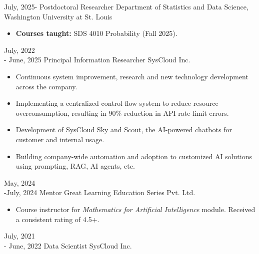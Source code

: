 \documentclass[10pt]{developercv} %
\begin{document}
\vspace{-12pt}
\begin{entrylist}
    \entry
    {July, 2025-}
    {Postdoctoral Researcher}
    {Department of Statistics and Data Science, Washington University at St. Louis}
    {\vspace{-7pt}\small
    \begin{itemize}[noitemsep,topsep=0pt,parsep=0pt,partopsep=0pt, leftmargin=10pt]
        \item \textbf{Courses taught:} SDS 4010 Probability (Fall 2025).
    \end{itemize}
    }
    \entry
    {July, 2022\\ - June, 2025}
    {Principal Information Researcher}
    {SysCloud Inc.}
    {\vspace{-7pt}\small
        \begin{itemize}[noitemsep,topsep=0pt,parsep=0pt,partopsep=0pt, leftmargin=10pt]
            \item Continuous system improvement, research and new technology development across the company.
            \item Implementing a centralized control flow system to reduce resource overconsumption, resulting in $90\%$ reduction in API rate-limit errors.
            \item Development of SysCloud Sky and Scout, the AI-powered chatbots for customer and internal usage.  
            \item Building company-wide automation and adoption to customized AI solutions using prompting, RAG, AI agents, etc.
        \end{itemize}
    }
    \entry
    {May, 2024\\-July, 2024}
    {Mentor}
    {Great Learning Education Series Pvt. Ltd.}
    {\vspace{-7pt}\small
        \begin{itemize}[noitemsep,topsep=0pt,parsep=0pt,partopsep=0pt,leftmargin=10pt]
            \item Course instructor for \textit{Mathematics for Artificial Intelligence} module. Received a consistent rating of 4.5+.
        \end{itemize}
    }
    \entry
    {July, 2021\\- June, 2022}
    {Data Scientist}
    {SysCloud Inc.}
    {\vspace{-7pt}\small
}
\end{entrylist}
\end{document}

